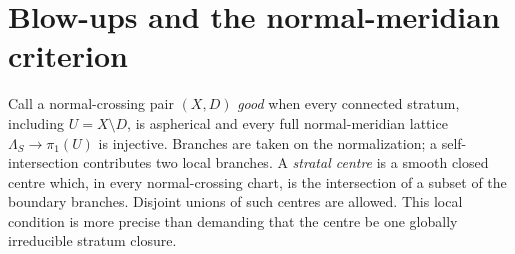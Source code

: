 \section{Blow-ups and the normal-meridian criterion}
\label{sec:blowups}

Call a normal-crossing pair $(X,D)$ \emph{good} when every connected
stratum, including $U=X\setminus D$, is aspherical and every full
normal-meridian lattice $\Lambda_S\to\pi _1(U)$ is injective. Branches
are taken on the normalization; a self-intersection contributes two
local branches. A \emph{stratal centre} is a smooth closed centre
which, in every normal-crossing chart, is the intersection of a
subset of the boundary branches. Disjoint unions of such centres
are allowed. This local condition is more precise than demanding
that the centre be one globally irreducible stratum closure.

